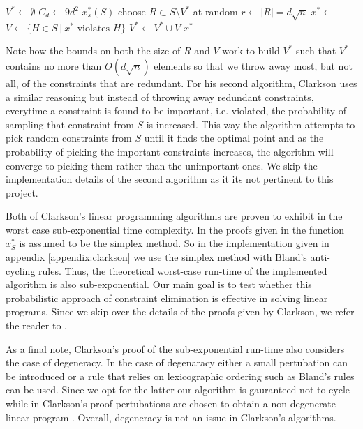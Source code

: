 \documentclass{standalone}
\begin{document}
{  \begin{algorithmic}
      \State $V^{*}\gets\emptyset$
      \State $C_{d}\gets 9d^{2}$
        \Return $x^{*}_{s}(S)$
      \EndIf
      \Repeat
        \State choose $R \subset S\setminus V^{*}$ at random
        \State $r\gets\left|R\right|=d\sqrt{n}$
        \State $x^{*}\gets$
        \State $V\gets\{H\in S\:|\:x^{*}\text{ violates }H\}$
          \State $V^{*}\gets V^{*}\cup V$
        \EndIf
      \State \Return $x^{*}$
    \EndFunction
  \end{algorithmic}
  Note how the bounds on both the size of $R$ and $V$ work to build $V^{*}$ such that $V^{*}$contains no more than $O(d\sqrt{n})$ elements \cite{clarkson1995vegas} so that we throw away most, but not all, of the constraints that are redundant. For his second algorithm, Clarkson uses a similar reasoning but instead of throwing away redundant constraints, everytime a constraint is found to be important, i.e. violated, the probability of sampling that constraint from $S$ is increased. This way the algorithm attempts to pick random constraints from $S$ until it finds the optimal point and as the probability of picking the important constraints increases, the algorithm will converge to picking them rather than the unimportant ones. We skip the implementation details of the second algorithm as it its not pertinent to this project.\par
  Both of Clarkson's linear programming algorithms are proven to exhibit in the worst case sub-exponential time complexity. In the proofs given in \cite{clarkson1995vegas} the function $x^{*}_{S}$ is assumed to be the simplex method. So in the implementation given in appendix \ref{appendix:clarkson} we use the simplex method with Bland's anti-cycling rules. Thus, the theoretical worst-case run-time of the implemented algorithm is also sub-exponential. Our main goal is to test whether this probabilistic approach of constraint elimination is effective in solving linear programs. Since we skip over the details of the proofs given by Clarkson, we refer the reader to \cite{clarkson1995vegas}.\par
  As a final note, Clarkson's proof of the sub-exponential run-time also considers the case of degeneracy. In the case of degenaracy either a small pertubation can be introduced or a rule that relies on lexicographic ordering such as Bland's rules can be used. Since we opt for the latter our algorithm is gauranteed not to cycle while in Clarkson's proof pertubations are chosen to obtain a non-degenerate linear program \cite{charnes1952optimality} \cite{clarkson1995vegas}. Overall, degeneracy is not an issue in Clarkson's algorithms.\par
}
\end{document}
